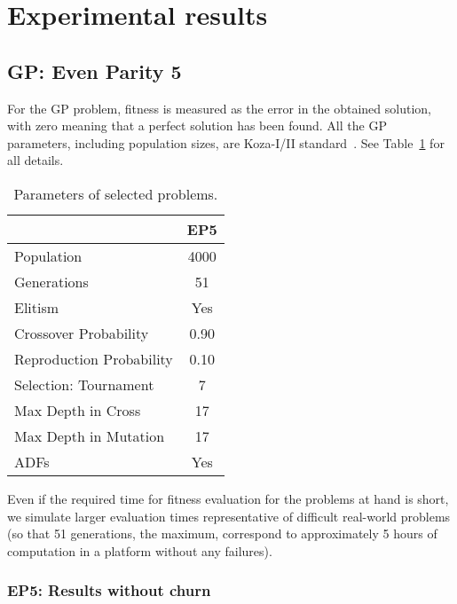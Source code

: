 \documentclass[graybox]{sty/svmult}
\begin{document}
\section{Experimental results}

\subsection{GP: Even Parity 5}

For the GP problem, fitness is measured as the error in the obtained solution, with zero meaning that a perfect solution has
been found. All the GP parameters, including population sizes, are
Koza-I/II standard~\cite{koza:book}.  See Table~\ref{tab:gp-parameters}
for all details.

\begin{table}
    \caption{Parameters of selected problems.}
    \begin{center}
\begin{tabular}{|l|c|}         
        \cline{2-2}
        \multicolumn{1}{c|}{} & EP5 \\
        \hline Population & 4000 \\
        \hline Generations & 51  \\
        \hline Elitism & Yes \\         
        \hline Crossover Probability & 0.90 \\         
        \hline Reproduction Probability & 0.10 \\
        \hline Selection: Tournament & 7 \\
        \hline Max Depth in Cross & 17 \\
        \hline Max Depth in Mutation & 17 \\
        \hline ADFs & Yes \\
        \hline     
    \end{tabular} 
\end{center}
\label{tab:gp-parameters} 
\end{table}

Even if the required time for fitness evaluation for
the problems at hand is short, we simulate larger evaluation times
representative of difficult real-world problems (so that 51 generations,
the maximum, correspond to approximately 5 hours of computation in a
platform without any failures).

\subsubsection{EP5: Results without churn}
\end{document}
